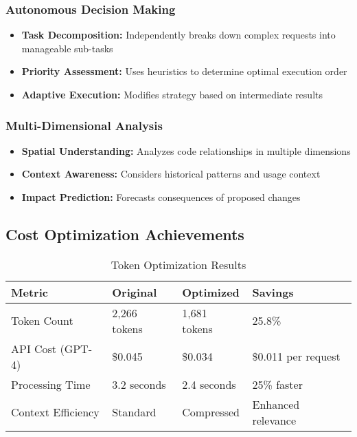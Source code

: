 \documentclass[12pt,a4paper]{article}
\begin{document}
\subsubsection{Autonomous Decision Making}
\begin{itemize}
    \item \textbf{Task Decomposition:} Independently breaks down complex requests into manageable sub-tasks
    \item \textbf{Priority Assessment:} Uses heuristics to determine optimal execution order
    \item \textbf{Adaptive Execution:} Modifies strategy based on intermediate results
\end{itemize}

\subsubsection{Multi-Dimensional Analysis}
\begin{itemize}
    \item \textbf{Spatial Understanding:} Analyzes code relationships in multiple dimensions
    \item \textbf{Context Awareness:} Considers historical patterns and usage context
    \item \textbf{Impact Prediction:} Forecasts consequences of proposed changes
\end{itemize}

\subsection{Cost Optimization Achievements}

\begin{table}[H]
\centering
\caption{Token Optimization Results}
\begin{tabularx}{\textwidth}{|l|X|X|X|}
\hline
\textbf{Metric} & \textbf{Original} & \textbf{Optimized} & \textbf{Savings} \\
\hline
Token Count & 2,266 tokens & 1,681 tokens & 25.8\% \\
\hline
API Cost (GPT-4) & \$0.045 & \$0.034 & \$0.011 per request \\
\hline
Processing Time & 3.2 seconds & 2.4 seconds & 25\% faster \\
\hline
Context Efficiency & Standard & Compressed & Enhanced relevance \\
\hline
\end{tabularx}
\end{table}
\end{document}
